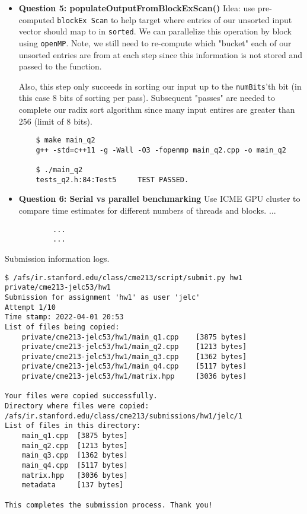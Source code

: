 \documentclass[12pt,letterpaper,twoside]{article}
\begin{document}
\begin{itemize}
    \item \textbf{Question 5: populateOutputFromBlockExScan()} Idea: use pre-computed
    \texttt{blockEx Scan} to help target where entries of our unsorted input vector
    should map to in \texttt{sorted}. We can parallelize this operation by block using 
    \texttt{openMP}. Note, we still need to re-compute which "bucket" each of our unsorted 
    entries are from at each step since this information is not stored and passed to the 
    function. 
    
    Also, this step only succeeds in sorting our input up to the \texttt{numBits}'th 
    bit (in this case 8 bits of sorting per pass). Subsequent "passes" are needed to complete
    our radix sort algorithm since many input entires are greater than 256 (limit of 8 bits).

    \begin{verbatim}
    $ make main_q2
    g++ -std=c++11 -g -Wall -O3 -fopenmp main_q2.cpp -o main_q2

    $ ./main_q2
    tests_q2.h:84:Test5     TEST PASSED.
    \end{verbatim}

    \item \textbf{Question 6: Serial vs parallel benchmarking} Use ICME GPU cluster to 
    compare time estimates for different numbers of threads and blocks. ...

    \begin{verbatim}
        ...
        ...
    \end{verbatim}

\end{itemize}




Submission information logs.
\begin{verbatim}
$ /afs/ir.stanford.edu/class/cme213/script/submit.py hw1 private/cme213-jelc53/hw1
Submission for assignment 'hw1' as user 'jelc'
Attempt 1/10
Time stamp: 2022-04-01 20:53
List of files being copied:
    private/cme213-jelc53/hw1/main_q1.cpp	 [3875 bytes]
    private/cme213-jelc53/hw1/main_q2.cpp	 [1213 bytes]
    private/cme213-jelc53/hw1/main_q3.cpp	 [1362 bytes]
    private/cme213-jelc53/hw1/main_q4.cpp	 [5117 bytes]
    private/cme213-jelc53/hw1/matrix.hpp	 [3036 bytes]

Your files were copied successfully.
Directory where files were copied: /afs/ir.stanford.edu/class/cme213/submissions/hw1/jelc/1
List of files in this directory:
    main_q1.cpp	 [3875 bytes]
    main_q2.cpp	 [1213 bytes]
    main_q3.cpp	 [1362 bytes]
    main_q4.cpp	 [5117 bytes]
    matrix.hpp	 [3036 bytes]
    metadata	 [137 bytes]

This completes the submission process. Thank you!
\end{verbatim}
\end{document}
